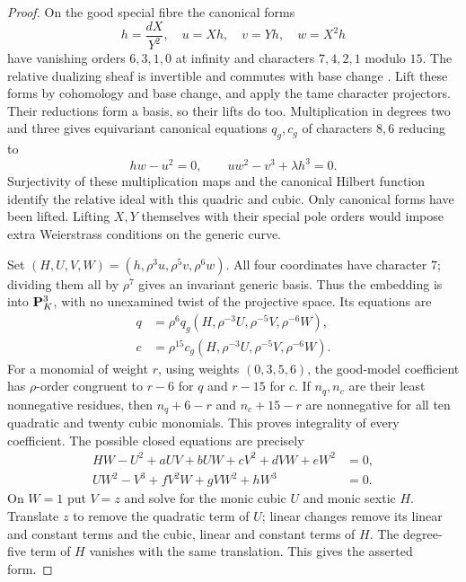 \begin{proof}
On the good special fibre the canonical forms
\[
 h=\frac{dX}{Y^2},\quad u=Xh,\quad v=Yh,\quad w=X^2h
\]
have vanishing orders $6,3,1,0$ at infinity and characters $7,4,2,1$
modulo $15$.  The relative dualizing sheaf is invertible and commutes
with base change \cite[Tag~0E6N]{Stacks}.
Lift these forms by cohomology and base change, and
apply the tame character projectors.  Their reductions form a basis,
so their lifts do too.  Multiplication in degrees two and three gives
equivariant canonical equations $q_g,c_g$ of characters $8,6$ reducing to
\[
 hw-u^2=0,\qquad uw^2-v^3+\lambda h^3=0.
\]
Surjectivity of these multiplication maps and the canonical Hilbert
function identify the relative ideal with this quadric and cubic.
Only canonical forms have been lifted.  Lifting $X,Y$ themselves
with their special pole orders would impose extra Weierstrass
conditions on the generic curve.

Set $(H,U,V,W)=(h,\rho^3u,\rho^5v,\rho^6w)$.
All four coordinates have character $7$; dividing them all by
$\rho^7$ gives an invariant generic basis.  Thus the embedding is
into $\mathbf P^3_K$, with no unexamined twist of the projective space.
Its equations are
\begin{equation}
 \begin{aligned}
 q&=\rho^6q_g(H,\rho^{-3}U,\rho^{-5}V,\rho^{-6}W),\\
 c&=\rho^{15}c_g(H,\rho^{-3}U,\rho^{-5}V,\rho^{-6}W).
 \end{aligned}
\label{eq:harmonic-canonical-lattice}
\end{equation}
For a monomial of weight $r$, using weights $(0,3,5,6)$, the
good-model coefficient has $\rho$-order congruent to $r-6$ for $q$
and $r-15$ for $c$.  If $n_q,n_c$ are their least nonnegative
residues, then $n_q+6-r$ and $n_c+15-r$ are nonnegative for all ten
quadratic and twenty cubic monomials.  This proves integrality of
every coefficient.  The possible closed equations are precisely
\[
 \begin{aligned}
 HW-U^2+aUV+bUW+cV^2+dVW+eW^2&=0,\\
 UW^2-V^3+fV^2W+gVW^2+hW^3&=0.
 \end{aligned}
\]
On $W=1$ put $V=z$ and solve for the monic cubic $U$ and monic
sextic $H$.  Translate $z$ to remove the quadratic term of $U$;
linear changes remove its linear and constant terms and the cubic,
linear and constant terms of $H$.  The degree-five term of $H$
vanishes with the same translation.  This gives the asserted form.


\end{proof}
